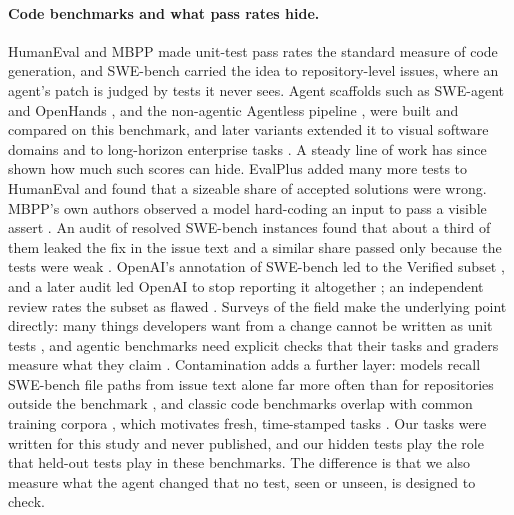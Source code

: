 \paragraph{Code benchmarks and what pass rates hide.}
HumanEval \citep{chen2021evaluating} and MBPP \citep{austin2021program} made
unit-test pass rates the standard measure of code generation, and SWE-bench
\citep{jimenez2024swebench} carried the idea to repository-level issues, where
an agent's patch is judged by tests it never sees. Agent scaffolds such as
SWE-agent \citep{yang2024sweagent} and OpenHands \citep{wang2025openhands},
and the non-agentic Agentless pipeline \citep{xia2025demystifying}, were built
and compared on this benchmark, and later variants extended it to visual
software domains \citep{yang2025swebench} and to long-horizon enterprise tasks
\citep{deng2025swebench}. A steady line of work has
since shown how much such scores can hide. EvalPlus \citep{liu2023evalplus}
added many more tests to HumanEval and found that a sizeable share of
accepted solutions were wrong. MBPP's own authors observed a model
hard-coding an input to pass a visible assert \citep{austin2021program}. An
audit of resolved SWE-bench instances found that about a third of them leaked
the fix in the issue text and a similar share passed only because the tests
were weak \citep{aleithan2024swebench}. OpenAI's annotation of SWE-bench led
to the Verified subset \citep{chowdhury2024introducing}, and a later audit led
OpenAI to stop reporting it altogether \citep{openai2026why}; an independent
review rates the subset as flawed \citep{epoch2026swebenchverified}. Surveys of
the field make the underlying point directly: many things developers want from
a change cannot be written as unit tests \citep{gu2025challenges}, and
agentic benchmarks need explicit checks that their tasks and graders measure
what they claim \citep{zhu2025establishing}. Contamination
adds a further layer: models recall SWE-bench file paths from issue text alone
far more often than for repositories outside the benchmark \citep{liang2025swebench}, and
classic code benchmarks overlap with common training corpora
\citep{riddell2024quantifying,matton2024leakage}, which motivates fresh,
time-stamped tasks \citep{jain2025livecodebench,zhang2025swebench,badertdinov2025swerebench}.
Our tasks were written for this study and never published, and our hidden
tests play the role that held-out tests play in these benchmarks. The
difference is that we also measure what the agent changed that no test, seen
or unseen, is designed to check.

